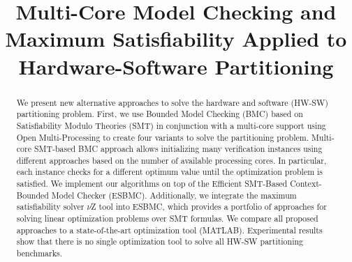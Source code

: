 \documentclass{doublecol-new}
\theoremstyle{TH}{
\newtheorem{lemma}{Lemma}
\newtheorem{theorem}[lemma]{Theorem}
\newtheorem{corrolary}[lemma]{Corrolary}
\newtheorem{conjecture}[lemma]{Conjecture}
\newtheorem{proposition}[lemma]{Proposition}
\newtheorem{claim}[lemma]{Claim}
\newtheorem{stheorem}[lemma]{Wrong Theorem}
\newtheorem{algorithm}{Algorithm}
}
\theoremstyle{THrm}{
\newtheorem{definition}{Definition}[section]
\newtheorem{question}{Question}[section]
\newtheorem{remark}{Remark}
\newtheorem{scheme}{Scheme}
}
\theoremstyle{THhit}{
\newtheorem{case}{Case}[section]
}
\begin{document}
%

\lstset{language=C,basicstyle=\small}
\lstset{numbers=left, numberstyle=\tiny, stepnumber=1, numbersep=5pt}
\lstset{tabsize=2}
\lstset{firstnumber=1}
\lstset{frame=single}

\setcounter{page}{1}






\BottomCatch



\subtitle{}

\title{Multi-Core Model Checking and Maximum Satisfiability Applied to Hardware-Software Partitioning}







\begin{abstract}
We present new alternative approaches to solve the hardware and software (HW-SW) partitioning problem. First, we use Bounded Model Checking (BMC) based on Satisfiability Modulo Theories (SMT) in conjunction with a multi-core support using Open Multi-Processing to create four variants to solve the partitioning problem. Multi-core SMT-based BMC approach allows initializing many verification instances using different approaches based on the number of available processing cores. In particular, each instance checks for a different optimum value until the optimization problem is satisfied. We implement our algorithms on top of the Efficient SMT-Based Context-Bounded Model Checker (ESBMC). Additionally, we integrate the maximum satisfiability solver $\nu$Z tool into ESBMC, which provides a portfolio of approaches for solving linear optimization problems over SMT formulas. We compare all proposed approaches to a state-of-the-art optimization tool (MATLAB). Experimental results show that there is no single optimization tool to solve all HW-SW partitioning benchmarks.
\end{abstract}
\end{document}
